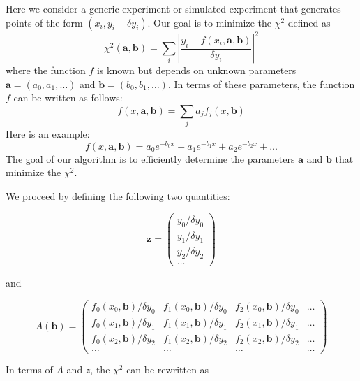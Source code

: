 \documentclass[justified,sixbynine]{tufte-book}
\theoremstyle{plain}%
\theoremstyle{definition}
\theoremstyle{remark}
\begin{document}
\begin{fullwidth}
Here we consider a generic experiment or simulated experiment that generates points of the form $(x_i,y_i \pm \delta y_i)$. Our goal is to minimize the $\chi^2$ defined as
\begin{equation}
\chi^2(\mathbf{a},\mathbf{b}) = \sum _i \left|
\frac{y_i - f(x_i,\mathbf{a},\mathbf{b})}{\delta y_i}
\right|^2
\end{equation}
where the function $f$ is known but depends on unknown parameters $\mathbf{a}=(a_0,a_1,\dots)$ and $\mathbf{b}=(b_0,b_1,\dots)$. In terms of these parameters, the function $f$ can be written as follows:
\begin{equation}
f(x,\mathbf{a},\mathbf{b}) = \sum_j a_j f_j(x, \mathbf{b})
\end{equation}
Here is an example:
\begin{equation}
f(x,\mathbf{a},\mathbf{b}) = a_0 e^{-b_0 x} + a_1 e^{-b_1 x} + a_2 e^{-b_2 x} +\dots 
\end{equation}
The goal of our algorithm is to efficiently determine the parameters $\mathbf{a}$ and $\mathbf{b}$ that minimize the $\chi^2$.

We proceed by defining the following two quantities:

\begin{equation}
\mathbf{z} = 
\begin{pmatrix}
y_0 / \delta y_0 \\
y_1 / \delta y_1 \\
y_2 / \delta y_2 \\
\dots
\end{pmatrix}
\end{equation}

and

\begin{equation}
A(\mathbf{b}) = 
\begin{pmatrix}
f_0(x_0,\mathbf{b})/\delta y_0 &
f_1(x_0,\mathbf{b})/\delta y_0 &
f_2(x_0,\mathbf{b})/\delta y_0 & \dots \\
f_0(x_1,\mathbf{b})/\delta y_1 &
f_1(x_1,\mathbf{b})/\delta y_1 &
f_2(x_1,\mathbf{b})/\delta y_1 & \dots \\
f_0(x_2,\mathbf{b})/\delta y_2 &
f_1(x_2,\mathbf{b})/\delta y_2 &
f_2(x_2,\mathbf{b})/\delta y_2 & \dots \\
\dots & \dots & \dots &\dots 
\end{pmatrix}
\end{equation}

In terms of $A$ and $z$, the $\chi^2$ can be rewritten as


\end{fullwidth}
\end{document}
